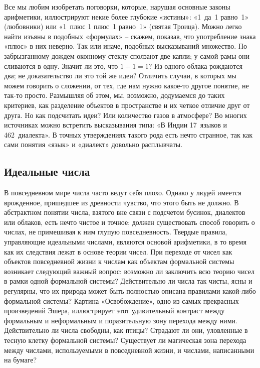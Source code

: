 \documentclass[../main.tex]{subfiles}
\begin{document}
Все мы любим изобретать поговорки, которые, нарушая основные законы арифметики, иллюстрируют некие более глубокие «истины»: «1~да~1 равно~1» (любовники) или «1~плюс 1 плюс~1 равно~1» (святая Троица). Можно легко найти изъяны в подобных «формулах» \--- скажем, показав, что употребление знака «плюс» в них неверно. Так или иначе, подобных высказываний множество. По забрызганному дождем оконному стеклу сползают две капли; у самой рамы они сливаются в одну. Значит ли это, что $1 + 1 = 1$? Из одного облака рождаются два; не доказательство ли это той же идеи? Отличить случаи, в которых мы можем говорить о сложении, от тех, где нам нужно какое-то другое понятие, не так-то просто. Размышляя об этом, мы, возможно, додумаемся до таких критериев, как разделение объектов в пространстве и их четкое отличие друг от друга. Но как подсчитать идеи? Или количество газов в атмосфере? Во многих источниках можно встретить высказывания типа: «В Индии 17~языков и 462~диалекта». В точных утверждениях такого рода есть нечто странное, так как сами понятия «язык» и «диалект» довольно расплывчаты.


\subsection{Идеальные числа}

В повседневном мире числа часто ведут себя плохо. Однако у людей имеется врожденное, пришедшее из древности чувство, что этого быть не должно. В абстрактном понятии числа, взятого вне связи с подсчетом бусинок, диалектов или облаков, есть нечто чистое и точное; должен существовать способ говорить о числах, не примешивая к ним глупую повседневность. Твердые правила, управляющие идеальными числами, являются основой арифметики, в то время как их следствия лежат в основе теории чисел. При переходе от чисел как объектов повседневной жизни к числам как объектам формальной системы возникает следующий важный вопрос: возможно ли заключить всю теорию чисел в рамки одной формальной системы? Действительно ли числа так чисты, ясны и регулярны, что их природа может быть полностью описана правилами какой-либо формальной системы? Картина «Освобождение», одно из самых прекрасных произведений Эшера, иллюстрирует этот удивительный контраст между формальным и неформальным и поразительную зону перехода между ними. Действительно ли числа свободны, как птицы? Страдают ли они, уловленные в тесную клетку формальной системы? Существует ли магическая зона перехода между числами, используемыми в повседневной жизни, и числами, написанными на бумаге?
\end{document}
